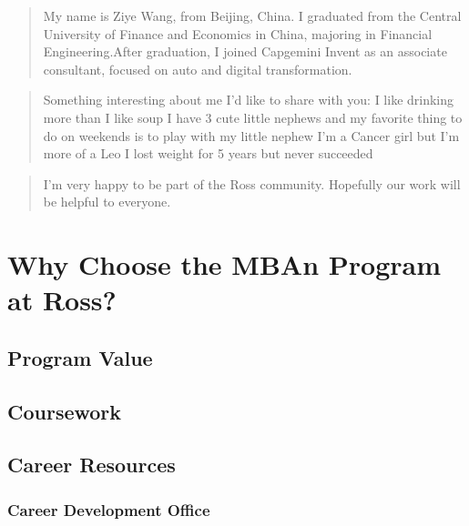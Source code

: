 \documentclass[
]{book}
\begin{document}
\begin{quote}
My name is Ziye Wang, from Beijing, China. I graduated from the Central University of Finance and Economics in China, majoring in Financial Engineering.After graduation, I joined Capgemini Invent as an associate consultant, focused on auto and digital transformation.
\end{quote}

\begin{quote}
Something interesting about me I'd like to share with you:
I like drinking more than I like soup
I have 3 cute little nephews and my favorite thing to do on weekends is to play with my little nephew
I'm a Cancer girl but I'm more of a Leo
I lost weight for 5 years but never succeeded
\end{quote}

\begin{quote}
I'm very happy to be part of the Ross community. Hopefully our work will be helpful to everyone.
\end{quote}

\hypertarget{why-choose-the-mban-program-at-ross}{%
\chapter*{Why Choose the MBAn Program at Ross?}\label{why-choose-the-mban-program-at-ross}}

\hypertarget{program-value}{%
\section{Program Value}\label{program-value}}

\hypertarget{coursework}{%
\section{Coursework}\label{coursework}}

\hypertarget{career-resources}{%
\section{Career Resources}\label{career-resources}}

\hypertarget{career-development-office}{%
\subsection{Career Development Office}\label{career-development-office}}
\end{document}
